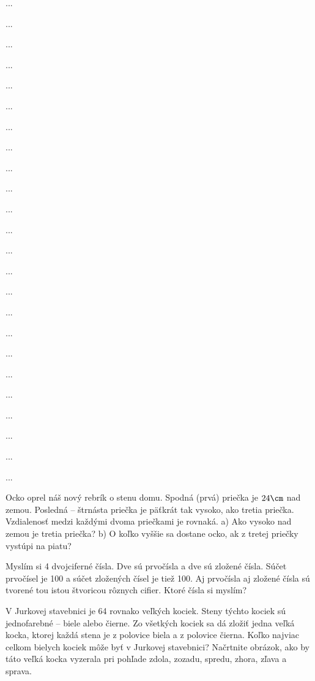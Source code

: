 ﻿{%
...}

{%
...}

{%
...}

{%
...}

{%
...}

{%
...}

{%
...}

{%
...}

{%
...}

{%
...}

{%
...}

{%
...}

{%
...}

{%
...}

{%
...}

{%
...}

{%
...}

{%
...}

{%
...}

{%
...}

{%
...}

{%
...}

{%
...}

{%
...}

{%
Ocko oprel náš nový rebrík o stenu domu. Spodná (prvá) priečka je $24\cm$ nad zemou.
Posledná -- štrnásta priečka je päťkrát tak vysoko, ako tretia priečka. Vzdialenosť medzi
každými dvoma priečkami je rovnaká.
\ite a) Ako vysoko nad zemou je tretia priečka?
\ite b) O koľko vyššie sa dostane ocko, ak z tretej priečky vystúpi na piatu?
}

{%
Myslím si 4 dvojciferné čísla. Dve sú prvočísla a dve sú zložené čísla. Súčet prvočísel je 100
a súčet zložených čísel je tiež 100. Aj prvočísla aj zložené čísla sú tvorené tou istou štvoricou
rôznych cifier. Ktoré čísla si myslím?}

{%
V Jurkovej stavebnici je 64 rovnako veľkých kociek. Steny týchto kociek sú jednofarebné --
biele alebo čierne. Zo všetkých kociek sa dá zložiť jedna veľká kocka, ktorej každá stena je
z polovice biela a z polovice čierna. Koľko najviac celkom bielych kociek môže byť
v Jurkovej stavebnici? Načrtnite obrázok, ako by táto veľká kocka vyzerala pri pohľade zdola,
zozadu, spredu, zhora, zľava a sprava.}

